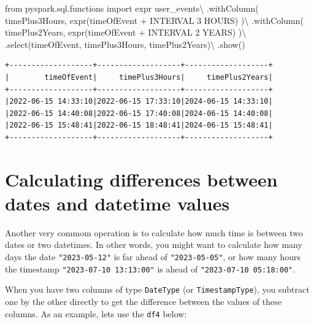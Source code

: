 \documentclass[
  11pt,
  letterpaper,
  DIV=11,
  numbers=noendperiod]{scrreprt}
\newenvironment{Shaded}{\begin{snugshade}}{\end{snugshade}}
\newcommand{\ImportTok}[1]{\textcolor[rgb]{0.00,0.46,0.62}{#1}}
\newcommand{\NormalTok}[1]{\textcolor[rgb]{0.00,0.23,0.31}{#1}}
\newcommand{\OperatorTok}[1]{\textcolor[rgb]{0.37,0.37,0.37}{#1}}
\newcommand{\StringTok}[1]{\textcolor[rgb]{0.13,0.47,0.30}{#1}}
\begin{document}
\begin{Shaded}
\begin{Highlighting}[]
\ImportTok{from}\NormalTok{ pyspark.sql.functions }\ImportTok{import}\NormalTok{ expr}
\NormalTok{user\_events}\OperatorTok{\textbackslash{}}
\NormalTok{    .withColumn(}
        \StringTok{\textquotesingle{}timePlus3Hours\textquotesingle{}}\NormalTok{,}
\NormalTok{        expr(}\StringTok{\textquotesingle{}timeOfEvent + INTERVAL 3 HOURS\textquotesingle{}}\NormalTok{)}
\NormalTok{    )}\OperatorTok{\textbackslash{}}
\NormalTok{    .withColumn(}
        \StringTok{\textquotesingle{}timePlus2Years\textquotesingle{}}\NormalTok{,}
\NormalTok{        expr(}\StringTok{\textquotesingle{}timeOfEvent + INTERVAL 2 YEARS\textquotesingle{}}\NormalTok{)}
\NormalTok{    )}\OperatorTok{\textbackslash{}}
\NormalTok{    .select(}\StringTok{\textquotesingle{}timeOfEvent\textquotesingle{}}\NormalTok{, }\StringTok{\textquotesingle{}timePlus3Hours\textquotesingle{}}\NormalTok{, }\StringTok{\textquotesingle{}timePlus2Years\textquotesingle{}}\NormalTok{)}\OperatorTok{\textbackslash{}}
\NormalTok{    .show()}
\end{Highlighting}
\end{Shaded}

\begin{verbatim}
+-------------------+-------------------+-------------------+
|        timeOfEvent|     timePlus3Hours|     timePlus2Years|
+-------------------+-------------------+-------------------+
|2022-06-15 14:33:10|2022-06-15 17:33:10|2024-06-15 14:33:10|
|2022-06-15 14:40:08|2022-06-15 17:40:08|2024-06-15 14:40:08|
|2022-06-15 15:48:41|2022-06-15 18:48:41|2024-06-15 15:48:41|
+-------------------+-------------------+-------------------+
\end{verbatim}

\section{Calculating differences between dates and datetime
values}\label{calculating-differences-between-dates-and-datetime-values}

Another very commom operation is to calculate how much time is between
two dates or two datetimes. In other words, you might want to calculate
how many days the date \texttt{"2023-05-12"} is far ahead of
\texttt{"2023-05-05"}, or how many hours the timestamp
\texttt{"2023-07-10\ 13:13:00"} is ahead of
\texttt{"2023-07-10\ 05:18:00"}.

When you have two columns of type \texttt{DateType} (or
\texttt{TimestampType}), you subtract one by the other directly to get
the difference between the values of these columns. As an example, lets
use the \texttt{df4} below:
\end{document}
